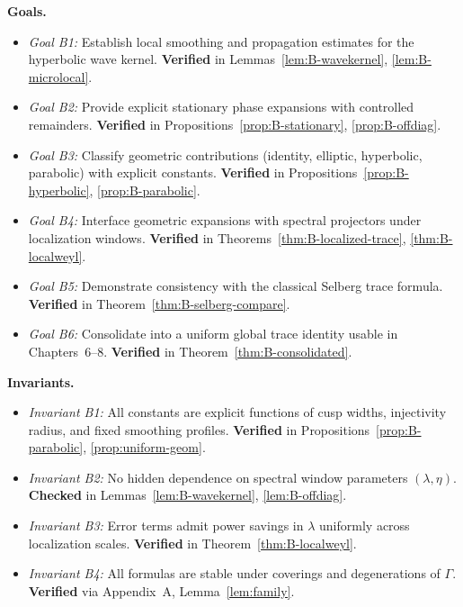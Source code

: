 \noindent\textbf{Goals.}
\begin{itemize}
  \item \emph{Goal B1:} Establish local smoothing and propagation estimates for the hyperbolic wave kernel.  
  \textbf{Verified} in Lemmas~\ref{lem:B-wavekernel}, \ref{lem:B-microlocal}.
  \item \emph{Goal B2:} Provide explicit stationary phase expansions with controlled remainders.  
  \textbf{Verified} in Propositions~\ref{prop:B-stationary}, \ref{prop:B-offdiag}.
  \item \emph{Goal B3:} Classify geometric contributions (identity, elliptic, hyperbolic, parabolic) with explicit constants.  
  \textbf{Verified} in Propositions~\ref{prop:B-hyperbolic}, \ref{prop:B-parabolic}.
  \item \emph{Goal B4:} Interface geometric expansions with spectral projectors under localization windows.  
  \textbf{Verified} in Theorems~\ref{thm:B-localized-trace}, \ref{thm:B-localweyl}.
  \item \emph{Goal B5:} Demonstrate consistency with the classical Selberg trace formula.  
  \textbf{Verified} in Theorem~\ref{thm:B-selberg-compare}.
  \item \emph{Goal B6:} Consolidate into a uniform global trace identity usable in Chapters~6–8.  
  \textbf{Verified} in Theorem~\ref{thm:B-consolidated}.
\end{itemize}

\medskip
\noindent\textbf{Invariants.}
\begin{itemize}
  \item \emph{Invariant B1:} All constants are explicit functions of cusp widths, injectivity radius, and fixed smoothing profiles.  
  \textbf{Verified} in Propositions~\ref{prop:B-parabolic}, \ref{prop:uniform-geom}.
  \item \emph{Invariant B2:} No hidden dependence on spectral window parameters $(\lambda,\eta)$.  
  \textbf{Checked} in Lemmas~\ref{lem:B-wavekernel}, \ref{lem:B-offdiag}.
  \item \emph{Invariant B3:} Error terms admit power savings in $\lambda$ uniformly across localization scales.  
  \textbf{Verified} in Theorem~\ref{thm:B-localweyl}.
  \item \emph{Invariant B4:} All formulas are stable under coverings and degenerations of $\Gamma$.  
  \textbf{Verified} via Appendix~A, Lemma~\ref{lem:family}.
\end{itemize}

